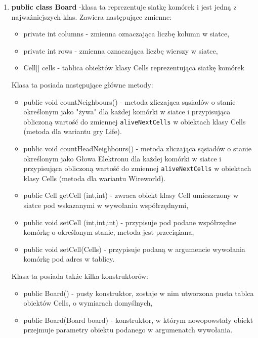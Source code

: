 \documentclass[10pt, oneside]{article}
\begin{document}
\begin {enumerate}
\item  \textbf{ public class Board} -klasa ta reprezentuje siatkę komórek i jest jedną z najważniejszych klas. Zawiera następujące zmienne:
\begin{itemize}
	\item private int columns - zmienna oznaczająca liczbę kolumn w siatce,
	\item private int rows - zmienna oznaczająca liczbę wierszy w siatce,
	\item Cell[] cells - tablica obiektów klasy Cells reprezentująca siatkę komórek
\end{itemize}
 
Klasa ta posiada następujące główne metody:
\begin {itemize}
	\item public void countNeighbours()  - metoda zliczająca sąsiadów o stanie określonym jako "żywa" dla każdej komórki w siatce i przypisująca obliczoną wartość do zmiennej \texttt{aliveNextCells} w obiektach klasy Cells (metoda dla wariantu gry Life).
		\item public void countHeadNeighbours()  - metoda zliczająca sąsiadów o stanie określonym jako Głowa Elektronu dla każdej komórki w siatce i przypisująca obliczoną wartość do zmiennej \texttt{aliveNextCells} w obiektach klasy Cells (metoda dla wariantu Wireworld).
	\item public Cell getCell (int,int) - zwraca obiekt klasy Cell umieszczony w siatce pod wskazanymi w wywołaniu współrzędnymi,
	\item public void setCell (int,int,int) - przypisuje pod podane współrzędne komórkę o określonym stanie, metoda jest przeciążana,
	\item public void setCell(Cells) - przypisuje podaną w argumencie wywołania komórkę pod adres w tablicy.
\end{itemize}	
	
Klasa ta posiada także kilka konstruktorów:
\begin {itemize}
\item public Board() - pusty konstruktor, zostaje w nim utworzona pusta tablca obiektów Cells, o wymiarach domyślnych,
\item public Board(Board board) - konstruktor, w którym nowopowstały obiekt przejmuje parametry obiektu podanego w argumenatch wywołania.
\end{itemize}
\end{enumerate}
\end{document}
